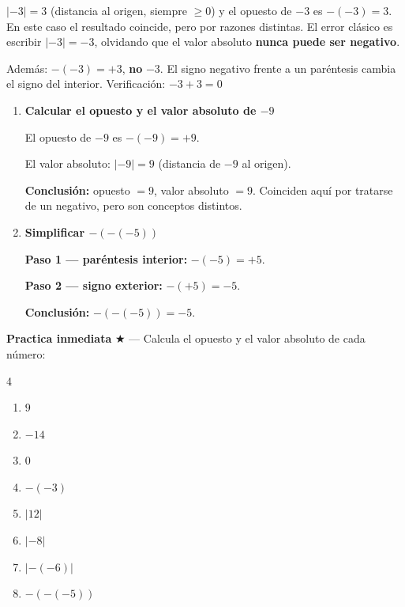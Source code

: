 \documentclass[11pt, letterpaper]{article}
\begin{document}
\begin{tcolorbox}[warningbox, title={Error frecuente --- confundir opuesto con valor absoluto}]
$|-3|=3$ (distancia al origen, siempre $\geq 0$) y el opuesto de $-3$ es $-(-3)=3$. En este caso el resultado coincide, pero por razones distintas. El error cl\'asico es escribir $|-3|=-3$, olvidando que el valor absoluto \textbf{nunca puede ser negativo}.

Adem\'as: $-(-3)=+3$, \textbf{no} $-3$. El signo negativo frente a un par\'entesis cambia el signo del interior. Verificaci\'on: $-3+3=0$ \checkmark
\end{tcolorbox}

\begin{tcolorbox}[examplebox, title={Ejemplos --- opuesto y valor absoluto}]
\begin{enumerate}[label=\textbf{Ej. \arabic*.}, leftmargin=*, itemsep=12pt]

\item \textbf{Calcular el opuesto y el valor absoluto de $-9$}

El opuesto de $-9$ es $-(-9)=+9$.

\medskip
El valor absoluto: $|-9|=9$ (distancia de $-9$ al origen).

\medskip
\textbf{Conclusi\'on:} opuesto $=9$, valor absoluto $=9$. Coinciden aqu\'i por tratarse de un negativo, pero son conceptos distintos.

\item \textbf{Simplificar $-(-(-5))$}

\textbf{Paso 1 --- par\'entesis interior:} $-(-5)=+5$.

\medskip
\textbf{Paso 2 --- signo exterior:} $-(+5)=-5$.

\medskip
\textbf{Conclusi\'on:} $-(-(-5))=-5$.

\end{enumerate}
\end{tcolorbox}

\medskip
\textbf{Practica inmediata} \quad $\bigstar$ --- Calcula el opuesto y el valor absoluto de cada n\'umero:
\begin{multicols}{4}
\begin{enumerate}[label=\alph*), leftmargin=*]
  \item $9$
  \item $-14$
  \item $0$
  \item $-(-3)$
  \item $|12|$
  \item $|-8|$
  \item $|-(-6)|$
  \item $-(-(-5))$
\end{enumerate}
\end{multicols}
\end{document}
